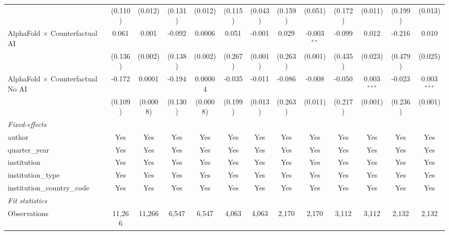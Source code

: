 \begin{tabular}{lcccccccccccc}
                                            & (0.110) & (0.012)       & (0.131) & (0.012)      & (0.115) & (0.043) & (0.159) & (0.051)       & (0.172) & (0.011)       & (0.199) & (0.013)\\   
   AlphaFold $\times$ Counterfactual AI     & 0.061   & 0.001         & -0.092  & 0.0006       & 0.051   & -0.001  & 0.029   & -0.003$^{**}$ & -0.099  & 0.012         & -0.216  & 0.010\\   
                                            & (0.136) & (0.002)       & (0.138) & (0.002)      & (0.267) & (0.001) & (0.263) & (0.001)       & (0.435) & (0.023)       & (0.479) & (0.025)\\   
   AlphaFold $\times$ Counterfactual No AI  & -0.172  & 0.0001        & -0.194  & 0.00004      & -0.035  & -0.011  & -0.086  & -0.008        & -0.050  & 0.003$^{***}$ & -0.023  & 0.003$^{***}$\\   
                                            & (0.109) & (0.0008)      & (0.130) & (0.0008)     & (0.199) & (0.013) & (0.263) & (0.011)       & (0.217) & (0.001)       & (0.236) & (0.001)\\   
   \midrule
   \emph{Fixed-effects}\\
   author                                   & Yes     & Yes           & Yes     & Yes          & Yes     & Yes     & Yes     & Yes           & Yes     & Yes           & Yes     & Yes\\  
   quarter\_year                            & Yes     & Yes           & Yes     & Yes          & Yes     & Yes     & Yes     & Yes           & Yes     & Yes           & Yes     & Yes\\  
   institution                              & Yes     & Yes           & Yes     & Yes          & Yes     & Yes     & Yes     & Yes           & Yes     & Yes           & Yes     & Yes\\  
   institution\_type                        & Yes     & Yes           & Yes     & Yes          & Yes     & Yes     & Yes     & Yes           & Yes     & Yes           & Yes     & Yes\\  
   institution\_country\_code               & Yes     & Yes           & Yes     & Yes          & Yes     & Yes     & Yes     & Yes           & Yes     & Yes           & Yes     & Yes\\  
   \midrule
   \emph{Fit statistics}\\
   Observations                             & 11,266  & 11,266        & 6,547   & 6,547        & 4,063   & 4,063   & 2,170   & 2,170         & 3,112   & 3,112         & 2,132   & 2,132\\  

\end{tabular}

